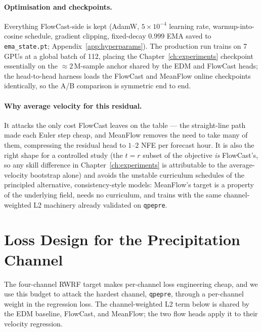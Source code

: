 \paragraph{Optimisation and checkpoints.} Everything FlowCast-side is kept (AdamW, $5 \times 10^{-4}$ learning rate, warmup-into-cosine schedule, gradient clipping, fixed-decay $0.999$ EMA saved to \texttt{ema\_state.pt}; Appendix~\ref{app:hyperparams}). The production run trains on 7 GPUs at a global batch of 112, placing the Chapter~\ref{ch:experiments} checkpoint essentially on the $\approx 2$\,M-sample anchor shared by the EDM and FlowCast heads; the head-to-head harness loads the FlowCast and MeanFlow online checkpoints identically, so the A/B comparison is symmetric end to end.

\paragraph{Why average velocity for this residual.} It attacks the only cost FlowCast leaves on the table --- the straight-line path made each Euler step cheap, and MeanFlow removes the need to take many of them, compressing the residual head to $1$--$2$ NFE per forecast hour. It is also the right shape for a controlled study (the $t = r$ subset of the objective \emph{is} FlowCast's, so any skill difference in Chapter~\ref{ch:experiments} is attributable to the average-velocity bootstrap alone) and avoids the unstable curriculum schedules of the principled alternative, consistency-style models: MeanFlow's target is a property of the underlying field, needs no curriculum, and trains with the same channel-weighted L2 machinery already validated on \texttt{qpepre}.

\section{Loss Design for the Precipitation Channel}
\label{sec:method-qpepre}

The four-channel RWRF target makes per-channel loss engineering cheap, and we use this budget to attack the hardest channel, \texttt{qpepre}, through a per-channel weight in the regression loss. The channel-weighted L2 term below is shared by the EDM baseline, FlowCast, and MeanFlow; the two flow heads apply it to their velocity regression.

